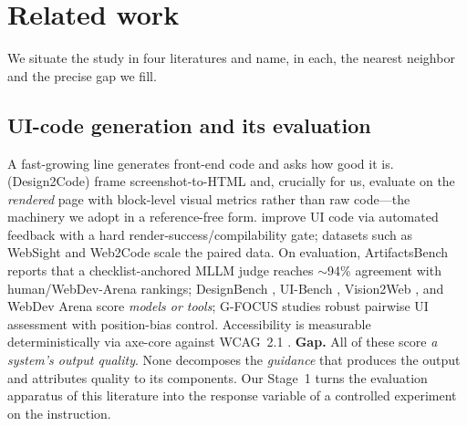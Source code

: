 \section{Related work}
\label{sec:related}

We situate the study in four literatures and name, in each, the nearest neighbor and the
precise gap we fill.

\subsection{UI-code generation and its evaluation}
A fast-growing line generates front-end code and asks how good it is. \citet{si2024design2code}
(Design2Code) frame screenshot-to-HTML and, crucially for us, evaluate on the \emph{rendered}
page with block-level visual metrics rather than raw code---the machinery we adopt in a
reference-free form. \citet{wu2024uicoder} improve UI code via automated feedback with a hard
render-success/compilability gate; datasets such as WebSight \citep{laurencon2024websight} and
Web2Code \citep{yun2024web2code} scale the paired data. On evaluation, ArtifactsBench
\citep{zhang2025artifactsbench} reports that a checklist-anchored MLLM judge reaches
$\sim$94\% agreement with human/WebDev-Arena rankings; DesignBench \citep{xiao2025designbench},
UI-Bench \citep{uibench2025}, Vision2Web \citep{he2026vision2web}, and WebDev Arena
\citep{lmarena2025webdev} score \emph{models or tools}; G-FOCUS \citep{jeon2025gfocus}
studies robust pairwise UI assessment with position-bias control. Accessibility is measurable
deterministically via axe-core \citep{deque2024axecore} against WCAG~2.1 \citep{w3c2018wcag21}.
\textbf{Gap.} All of these score \emph{a system's output quality}. None decomposes the
\emph{guidance} that produces the output and attributes quality to its components. Our Stage~1
turns the evaluation apparatus of this literature into the response variable of a controlled
experiment on the instruction.

